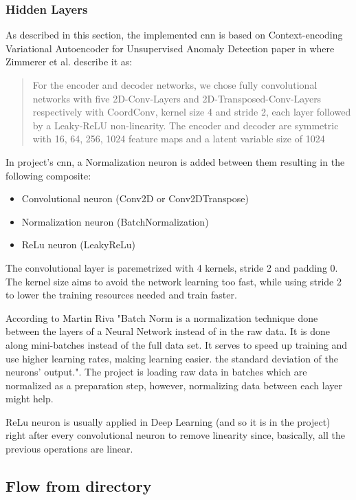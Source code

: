 \subsubsection{Hidden Layers}

As described in this section, the implemented \acrshort{cnn} is based on Context-encoding Variational Autoencoder for Unsupervised Anomaly Detection paper \cite{cevaemodel} in where Zimmerer et al. describe it as: 

\begin{quote}
    For the encoder and decoder networks, we chose fully convolutional networks with five 2D-Conv-Layers and 2D-Transposed-Conv-Layers respectively with CoordConv, kernel size 4 and stride 2, each layer followed by a Leaky-ReLU non-linearity. The encoder and decoder are symmetric with 16, 64, 256, 1024 feature maps and a latent variable size of 1024
\end{quote}

In project's \acrfull{cnn}, a Normalization neuron is added between them resulting in the following composite:

\begin{itemize}
    \item Convolutional neuron (Conv2D or Conv2DTranspose) 
    \item Normalization neuron (BatchNormalization)
    \item ReLu neuron (LeakyReLu)
\end{itemize}

The convolutional layer is paremetrized with 4 kernels, stride 2 and padding 0. The kernel size aims to avoid the network learning too fast, while using stride 2 to lower the training resources needed and train faster.

According to Martin Riva \cite{batchnorm} "Batch Norm is a normalization technique done between the layers of a Neural Network instead of in the raw data. It is done along mini-batches instead of the full data set. It serves to speed up training and use higher learning rates, making learning easier. the standard deviation of the neurons' output.". The project is loading raw data in batches which are normalized as a preparation step, however, normalizing data between each layer might help.

ReLu neuron is usually applied in Deep Learning (and so it is in the project) right after every convolutional neuron to remove linearity since, basically, all the previous operations are linear. 

\subsection{Flow from directory}


